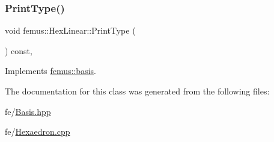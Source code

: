 \subsubsection{\texorpdfstring{Print\+Type()}{PrintType()}}
{\footnotesize\ttfamily void femus\+::\+Hex\+Linear\+::\+Print\+Type (\begin{DoxyParamCaption}{ }\end{DoxyParamCaption}) const\hspace{0.3cm}{\ttfamily [inline]}, {\ttfamily [virtual]}}



Implements \mbox{\hyperlink{classfemus_1_1basis_abbae7bf8f31ec5793c911bc6d4ea0572}{femus\+::basis}}.



The documentation for this class was generated from the following files\+:\begin{DoxyCompactItemize}
\item 
fe/\mbox{\hyperlink{_basis_8hpp}{Basis.\+hpp}}\item 
fe/\mbox{\hyperlink{_hexaedron_8cpp}{Hexaedron.\+cpp}}\end{DoxyCompactItemize}
